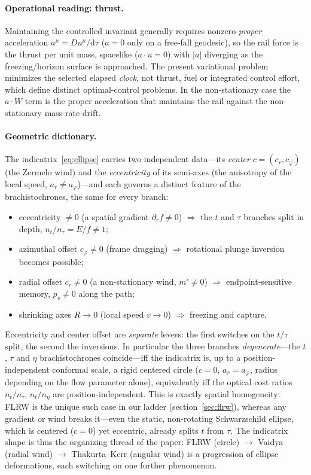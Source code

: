 \documentclass[12pt]{iopart}
\newcommand{\dd}{\mathrm{d}}
\theoremstyle{plain}
\theoremstyle{definition}
\theoremstyle{plain}
\theoremstyle{remark}
\begin{document}
\paragraph{Operational reading: thrust.} Maintaining the controlled invariant generally
requires nonzero \emph{proper} acceleration $a^\mu=Du^\mu/\dd\tau$ ($a=0$ only on a
free-fall geodesic), so the rail force is the thrust per unit mass, spacelike
($a\cdot u=0$) with $|a|$ diverging as the freezing/horizon surface is approached. The
present variational problem minimizes the selected elapsed \emph{clock}, not thrust, fuel
or integrated control effort, which define distinct optimal-control problems. In the
non-stationary case the $a\cdot W$ term is the proper acceleration that maintains the rail
against the non-stationary mass-rate drift.

\paragraph{Geometric dictionary.} The indicatrix~\eqref{eq:ellipse} carries two
independent data---its \emph{center} $c=(c_r,c_\varphi)$ (the Zermelo wind) and
the \emph{eccentricity} of its semi-axes (the anisotropy of the local speed,
$a_r\neq a_\varphi$)---and each governs a distinct feature of the
brachistochrones, the same for every branch:
\begin{itemize}\itemsep2pt
\item eccentricity $\neq0$ (a spatial gradient $\partial_r f\neq0$)
$\Rightarrow$ the $t$ and $\tau$ branches split in depth, $n_t/n_\tau=E/f\neq1$;
\item azimuthal offset $c_\varphi\neq0$ (frame dragging)
$\Rightarrow$ rotational plunge inversion becomes possible;
\item radial offset $c_r\neq0$ (a non-stationary wind, $m'\neq0$)
$\Rightarrow$ endpoint-sensitive memory, $p_v\neq0$ along the path;
\item shrinking axes $R\to0$ (local speed $v\to0$) $\Rightarrow$ freezing and
capture.
\end{itemize}
Eccentricity and center offset are \emph{separate} levers: the first switches on
the $t/\tau$ split, the second the inversions. In particular the three branches
\emph{degenerate}---the $t$, $\tau$ and $\eta$ brachistochrones coincide---iff the
indicatrix is, up to a position-independent conformal scale, a rigid centered
circle ($c=0$, $a_r=a_\varphi$, radius depending on the flow parameter alone),
equivalently iff the optical cost ratios $n_t/n_\tau,\,n_t/n_\eta$ are
position-independent. This is exactly spatial homogeneity: FLRW is the unique
such case in our ladder (section~\ref{sec:flrw}), whereas any gradient or wind
breaks it---even the static, non-rotating Schwarzschild ellipse, which is
centered ($c=0$) yet eccentric, already splits $t$ from $\tau$. The indicatrix
shape is thus the organizing thread of the paper: FLRW (circle) $\to$ Vaidya
(radial wind) $\to$ Thakurta--Kerr (angular wind) is a progression of ellipse
deformations, each switching on one further phenomenon.
\end{document}
